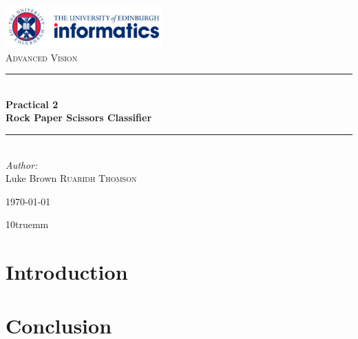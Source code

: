 \documentclass[12pt, a4paper]{article}
\def\thepretitle{Advanced Vision}
\def\themaintitle{Practical 2}
\def\thesubtitle{Rock Paper Scissors Classifier}
\def\firstname{Luke Brown}
\def\lastname{Ruaridh Thomson}
\newcommand{\HRule}{\rule{\linewidth}{0.5mm}} %
\begin{document}
\begin{titlepage}
\begin{center}
\includegraphics[width=0.45\textwidth]{uoe.jpg}\\[2cm]
\textsc{\LARGE \thepretitle}\\[1.5cm]

\HRule \\[0.4cm]
{ \huge \bfseries \themaintitle}\\[0.5cm]
{ \large \bfseries \thesubtitle}\\
\HRule \\[1.5cm]

\emph{Author:}\\ %

\firstname\textsc{ \lastname}\\

\vfill

{\large \today}

\end{center}
\end{titlepage}

\columnsep 10truemm
\twocolumn

\tableofcontents

\pagebreak

\section{Introduction}
\section{Conclusion}

\onecolumn
\newpage
\appendix
\appendixpage
\end{document}

